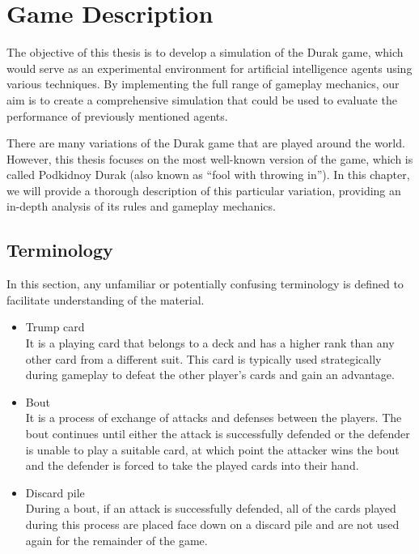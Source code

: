 \chapter{Game Description}
\label{GameDescription}
The objective of this thesis is to develop a simulation of the Durak game, which would serve as an experimental environment for artificial intelligence agents using various techniques. By implementing the full range of gameplay mechanics, our aim is to create a comprehensive simulation that could be used to evaluate the performance of previously mentioned agents.

There are many variations of the Durak game that are played around the world. However, this thesis focuses on the most well-known version of the game, which is called Podkidnoy Durak (also known as ``fool with throwing in'')\citep*{website:PAGAT_PODKIDNOY_DURAK}. In this chapter, we will provide a thorough description of this particular variation, providing an in-depth analysis of its rules and gameplay mechanics.

\section{Terminology}
In this section, any unfamiliar or potentially confusing terminology is defined to facilitate understanding of the material.

\begin{itemize}


        \item Trump card \\
        It is a playing card that belongs to a deck and has a higher rank than any other card from a different suit. This card is typically used strategically during gameplay to defeat the other player's cards and gain an advantage.
        \item Bout \\
         It is a process of exchange of attacks and defenses between the players. The bout continues until either the attack is successfully defended or the defender is unable to play a suitable card, at which point the attacker wins the bout and the defender is forced to take the played cards into their hand.
        \item Discard pile \\
         During a bout, if an attack is successfully defended, all of the cards played during this process are placed face down on a discard pile and are not used again for the remainder of the game.

\end{itemize}

